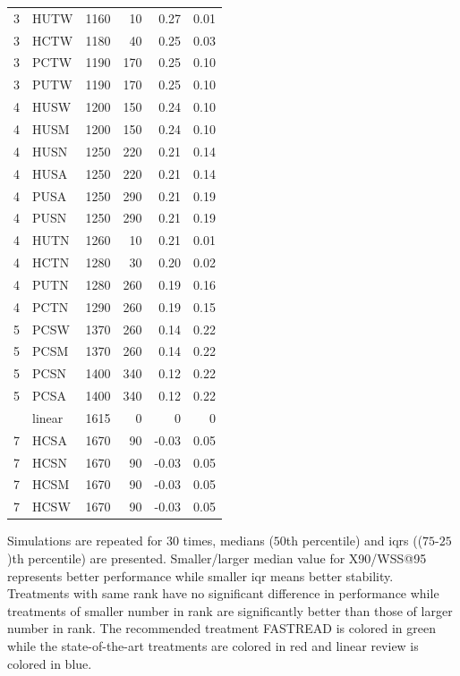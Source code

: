 \documentclass{svjour3}
\theoremstyle{break}
\begin{document}
\begin{table}
\begin{center}
{{\begin{tabular}{l@{~~~}l@{~~~}r@{~~~}r@{~~~}r@{~~~}r}
  3 &         HUTW &    1160  &  10 & 0.27 & 0.01 \\
  3 &         HCTW &    1180  &  40 & 0.25 & 0.03 \\
  \rowcolor{red!30}
  3 &         PCTW &    1190  &  170 & 0.25 & 0.10 \\
  3 &         PUTW &    1190  &  170 & 0.25 & 0.10 \\
\hline  4 &         HUSW &    1200  &  150 & 0.24 & 0.10 \\
  4 &         HUSM &    1200  &  150 & 0.24 & 0.10 \\
  4 &         HUSN &    1250  &  220 & 0.21 & 0.14 \\
  4 &         HUSA &    1250  &  220 & 0.21 & 0.14 \\
  \rowcolor{red!30}
  4 &         PUSA &    1250  &  290 & 0.21 & 0.19 \\
  4 &         PUSN &    1250  &  290 & 0.21 & 0.19 \\
  4 &         HUTN &    1260  &  10 & 0.21 & 0.01 \\
  \rowcolor{red!30}
  4 &         HCTN &    1280  &  30 & 0.20 & 0.02 \\
  4 &         PUTN &    1280  &  260 & 0.19 & 0.16 \\
  4 &         PCTN &    1290  &  260 & 0.19 & 0.15 \\
\hline  5 &         PCSW &    1370  &  260 & 0.14 & 0.22 \\
  5 &         PCSM &    1370  &  260 & 0.14 & 0.22 \\
  5 &         PCSN &    1400  &  340 & 0.12 & 0.22 \\
  5 &         PCSA &    1400  &  340 & 0.12 & 0.22 \\
\rowcolor{blue!50}
\hline  6 &       linear &    1615  &  0 & 0 & 0 \\
\hline  7 &         HCSA &    1670  &  90 & -0.03 & 0.05 \\
  7 &         HCSN &    1670  &  90 & -0.03 & 0.05 \\
  7 &         HCSM &    1670  &  90 & -0.03 & 0.05 \\
  7 &         HCSW &    1670  &  90 & -0.03 & 0.05 \\
\hline \end{tabular}}}

\end{center}
{\footnotesize Simulations are repeated for $30$ times, medians ($50$th percentile) and iqrs (($75$-$25$)th percentile) are presented. Smaller/larger median value for X90/WSS@95 represents better performance while smaller iqr means better stability. Treatments with same rank have no significant difference in performance while treatments of smaller number in rank are significantly better than those of larger number in rank. The recommended treatment FASTREAD is colored in {\setlength{\fboxsep}{1pt}\colorbox{green!40}{green}} while the state-of-the-art treatments are colored in {\setlength{\fboxsep}{1pt}\colorbox{red!30}{red}} and linear review is colored in {\setlength{\fboxsep}{1pt}\colorbox{blue!50}{blue}}.}


\end{table}
\end{document}
